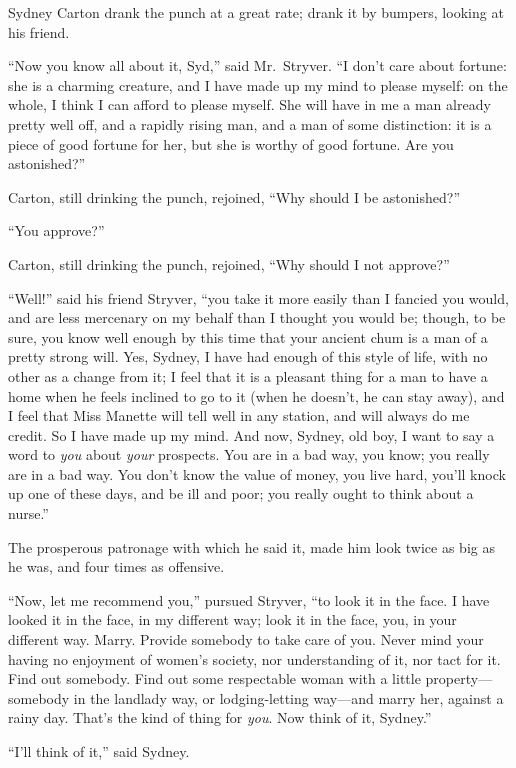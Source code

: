 Sydney Carton drank the punch at a great rate; drank it by bumpers,
looking at his friend.

``Now you know all about it, Syd,'' said Mr.\ Stryver.  ``I don't care
about fortune:  she is a charming creature, and I have made up my mind
to please myself:  on the whole, I think I can afford to please myself.
She will have in me a man already pretty well off, and a rapidly
rising man, and a man of some distinction:  it is a piece of good fortune
for her, but she is worthy of good fortune.  Are you astonished?''

Carton, still drinking the punch, rejoined, ``Why should I be astonished?''

``You approve?''

Carton, still drinking the punch, rejoined, ``Why should I not approve?''

``Well!'' said his friend Stryver, ``you take it more easily than I
fancied you would, and are less mercenary on my behalf than I thought
you would be; though, to be sure, you know well enough by this time
that your ancient chum is a man of a pretty strong will.  Yes, Sydney,
I have had enough of this style of life, with no other as a change
from it; I feel that it is a pleasant thing for a man to have a home
when he feels inclined to go to it (when he doesn't, he can stay away),
and I feel that Miss Manette will tell well in any station, and will
always do me credit.  So I have made up my mind.  And now, Sydney,
old boy, I want to say a word to \emph{you} about \emph{your} prospects.  You are
in a bad way, you know; you really are in a bad way.  You don't know
the value of money, you live hard, you'll knock up one of these days,
and be ill and poor; you really ought to think about a nurse.''

The prosperous patronage with which he said it, made him look twice
as big as he was, and four times as offensive.

``Now, let me recommend you,'' pursued Stryver, ``to look it in the face.
I have looked it in the face, in my different way; look it in the face,
you, in your different way.  Marry.  Provide somebody to take care of you.
Never mind your having no enjoyment of women's society, nor understanding
of it, nor tact for it.  Find out somebody.  Find out some respectable
woman with a little property---somebody in the landlady way, or
lodging-letting way---and marry her, against a rainy day.  That's the
kind of thing for \emph{you}.  Now think of it, Sydney.''

``I'll think of it,'' said Sydney.




